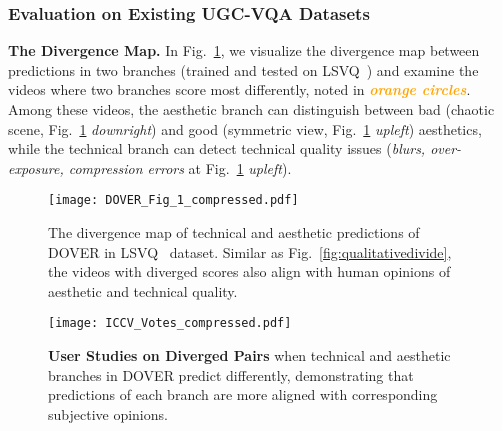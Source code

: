 \documentclass[10pt,twocolumn,letterpaper]{article}
\renewcommand{\paragraph}[1]{\noindent \textbf{#1}}
\newcommand{\orange}[1]{\textbf{\textcolor{orange}{#1}}}
\begin{document}
\vspace{-8pt}
\subsubsection{Evaluation on Existing UGC-VQA Datasets}
\label{sec:6a}
\paragraph{The Divergence Map.} In Fig.~\ref{fig:div}, we visualize the divergence map between predictions in two branches (trained and tested on LSVQ~\cite{pvq}) and examine the videos where two branches score most differently, noted in \orange{\textit{orange circles}}. Among these videos, the aesthetic branch can distinguish between bad (chaotic scene, Fig.~\ref{fig:div} \textit{downright}) and {good (symmetric view, Fig.~\ref{fig:div} \textit{upleft}) aesthetics}, while the technical branch can detect technical quality issues (\textit{blurs, over-exposure, compression errors} at Fig.~\ref{fig:div} \textit{upleft}).


\begin{figure}
    \centering
    \vspace{-3pt}
    \texttt{[image: DOVER\_Fig\_1\_compressed.pdf]}
    \vspace{-12pt}
    \caption{The divergence map of technical and aesthetic predictions of DOVER in LSVQ~\cite{pvq} dataset. Similar as Fig.~\ref{fig:qualitativedivide}, the videos with diverged scores also align with human opinions of aesthetic and technical quality.}
    \vspace{-10pt}
    \label{fig:div}
\end{figure}
\begin{figure}
    \centering
    \texttt{[image: ICCV\_Votes\_compressed.pdf]}
    \vspace{-9pt}
    \caption{\textbf{User Studies on Diverged Pairs} when technical and aesthetic branches in DOVER predict differently, demonstrating that predictions of each branch are more aligned with corresponding subjective opinions.}
    \vspace{-17pt}
    \label{fig:votes}
\end{figure}
\end{document}
